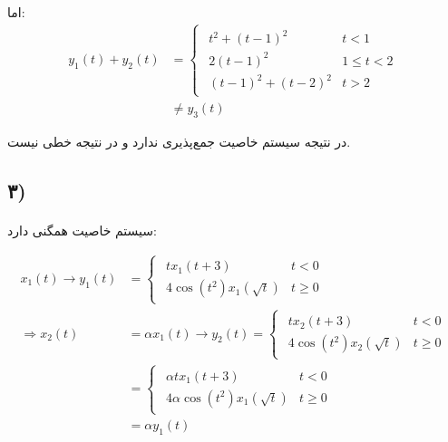 \documentclass{article}
\begin{document}
	اما:
	\begin{align*}
		y_1(t) + y_2(t) &=
		\begin{cases}
			\begin{matrix}
				t^2 + (t-1)^2 & t < 1 \\
				2(t-1)^2 & 1 \le t < 2 \\
				(t-1)^2 + (t-2)^2 & t > 2
			\end{matrix}
		\end{cases} \\
		& \ne y_3(t)
	\end{align*}

	در نتیجه سیستم خاصیت جمع‌پذیری ندارد و در نتیجه خطی نیست.

	\subsection*{۳)}
	\paragraph*{}
	سیستم خاصیت همگنی دارد:

	\begin{align*}
		x_1(t) \rightarrow y_1(t) &=
		\begin{cases}
			\begin{matrix}
				tx_1(t+3) & t < 0 \\
				4\cos(t^2)x_1(\sqrt t) & t \ge 0
			\end{matrix}
		\end{cases} \\
		\Rightarrow
		x_2(t) &= \alpha x_1(t) \rightarrow y_2(t) =
		\begin{cases}
			\begin{matrix}
				tx_2(t+3) & t < 0 \\
				4\cos(t^2)x_2(\sqrt t) & t \ge 0
			\end{matrix}
		\end{cases} \\
		&= \begin{cases}
			\begin{matrix}
				\alpha t x_1(t+3) & t < 0 \\
				4 \alpha \cos (t^2) x_1(\sqrt t) & t \ge 0
			\end{matrix}
		\end{cases} \\
		&= \alpha y_1(t)
	\end{align*}
\end{document}
